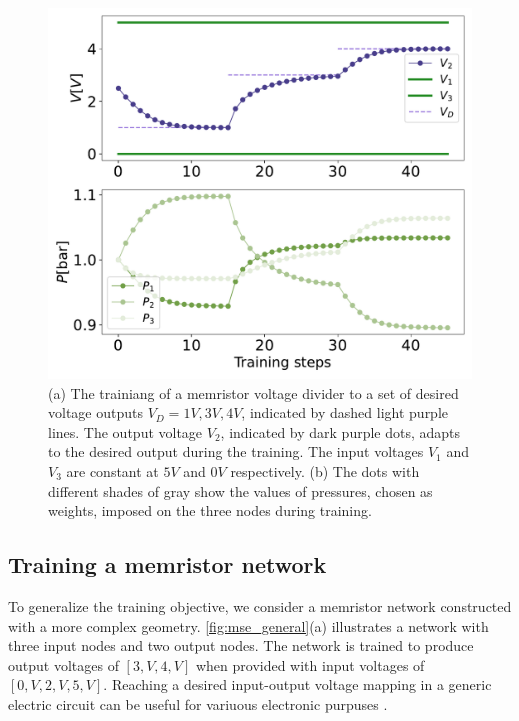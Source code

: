 \documentclass[reprint,superscriptaddress,prb,showkeys]{revtex4-2}
\begin{document}
\begin{figure}[h]
    \centering
    \includegraphics[width=0.8\columnwidth]{plots/voltage_divider/evolution_targets.pdf}
    \caption{(a) The trainiang of a memristor voltage divider to a set of desired voltage outputs $V_D = {1V, 3V, 4V}$, indicated by dashed light purple lines. The output voltage $V_2$, indicated by dark purple dots, adapts to the desired output during the training. The input voltages $V_1$ and $V_3$ are constant at $5V$ and $0V$ respectively. (b) The dots with different shades of gray show the values of pressures, chosen as weights, imposed on the three nodes during training.}\label{fig:evolution_targets}
\end{figure}

\subsection{Training a memristor network}

To generalize the training objective, we consider a memristor network constructed with a more complex geometry. \cref{fig:mse_general}(a) illustrates a network with three input nodes and two output nodes. The network is trained to produce output voltages of $[3,V, 4,V]$ when provided with input voltages of $[0,V, 2,V, 5,V]$.  Reaching a desired input-output voltage mapping in a generic electric circuit can be useful for variuous electronic purpuses \cite{voltage_controlled_oscillator, onchip_powerdistributed}. 
\end{document}
